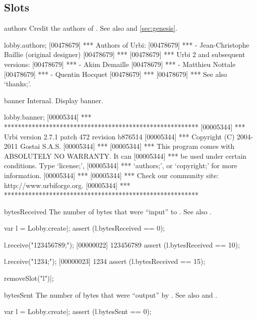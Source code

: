 \subsection{Slots}
\begin{urbiscriptapi}
\item[authors] Credit the authors of \usdk.  See also  and
  \autoref{sec:genesis}.
\begin{urbiscript}
lobby.authors;
[00478679] *** Authors of Urbi:
[00478679] ***  - Jean-Christophe Baillie (original designer)
[00478679] ***
[00478679] *** Urbi 2 and subsequent versions:
[00478679] ***  - Akim Demaille
[00478679] ***  - Matthieu Nottale
[00478679] ***  - Quentin Hocquet
[00478679] ***
[00478679] *** See also `thanks;'.
\end{urbiscript}


\item[banner] Internal.  Display \usdk banner.
\begin{urbiscript}
lobby.banner;
[00005344] *** ********************************************************
[00005344] *** Urbi version 2.7.1 patch 472 revision b876514
[00005344] *** Copyright (C) 2004-2011 Gostai S.A.S.
[00005344] ***
[00005344] *** This program comes with ABSOLUTELY NO WARRANTY.  It can
[00005344] *** be used under certain conditions.  Type `license;',
[00005344] *** `authors;', or `copyright;' for more information.
[00005344] ***
[00005344] *** Check our community site: http://www.urbiforge.org.
[00005344] *** ********************************************************
\end{urbiscript}


\item[bytesReceived] The number of bytes that were ``input'' to \this.  See
  also .
\begin{urbiscript}
var l = Lobby.create|;
assert (l.bytesReceived == 0);

l.receive("123456789;");
[00000022] 123456789
assert (l.bytesReceived == 10);

l.receive("1234;");
[00000023] 1234
assert (l.bytesReceived == 15);
\end{urbiscript}

\begin{urbicomment}
removeSlot("l")|;
\end{urbicomment}


\item[bytesSent] The number of bytes that were ``output'' by \this.  See
  also  and .
\begin{urbiscript}
var l = Lobby.create|;
assert (l.bytesSent == 0);


\end{urbiscript}
\end{urbiscriptapi}
